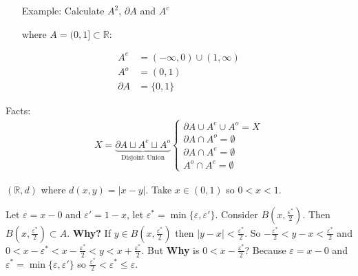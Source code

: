 \documentclass[10pt]{article}
\begin{document}
\begin{multicols}{2}
\begin{itemize}
\item[Example:] Calculate $A^{2}$, $\partial A$ and $A^{c}$ 

where $A=(0,1]\subset\mathbb{R}$:
\end{itemize}
\begin{align*}
    A^{e}&=(-\infty,0)\cup(1,\infty)\\
    A^{o}&=(0,1)\\
    \partial A&=\{0,1\}
\end{align*}

Facts:
\begin{align*}
X=\underbrace{\partial A\sqcup A^{e}\sqcup A^{o}}_{\text{Disjoint Union}}
    \begin{cases}
        \partial A\cup A^{e}\cup A^{o}=X\\
        \partial A\cap A^{o}=\emptyset\\
        \partial A\cap A^{e}=\emptyset\\
        A^{o}\cap A^{e}=\emptyset
    \end{cases}
\end{align*}
\end{multicols}
$(\mathbb{R},d)$ where $d(x,y)=|x-y|$. Take $x\in(0,1)$ so $0<x<1$. 
\begin{center}
\end{center}
Let $\varepsilon=x-0$ and $\varepsilon'=1-x$, let $\varepsilon^{*}=\min\{\varepsilon,\varepsilon'\}$. Consider $B(x,\frac{\varepsilon^{*}}{2})$. Then $B(x,\frac{\varepsilon^{*}}{2})\subset A$. \textbf{Why?} If $y\in B(x,\frac{\varepsilon^{*}}{2})$ then $|y-x|<\frac{\varepsilon^{*}}{2}$. So $-\frac{\varepsilon^{*}}{2}<y-x<\frac{\varepsilon^{*}}{2}$ and $0<x-\varepsilon^{*}<x-\frac{\varepsilon^{*}}{2}<y<x+\frac{\varepsilon^{*}}{2}$. But \textbf{Why} is $0<x-\frac{\varepsilon^{*}}{2}$? Because $\varepsilon=x-0$ and $\varepsilon^{*}=\min\{\varepsilon,\varepsilon'\}$ so $\frac{\varepsilon^{*}}{2}<\varepsilon^{*}\leq\varepsilon$.
\end{document}
